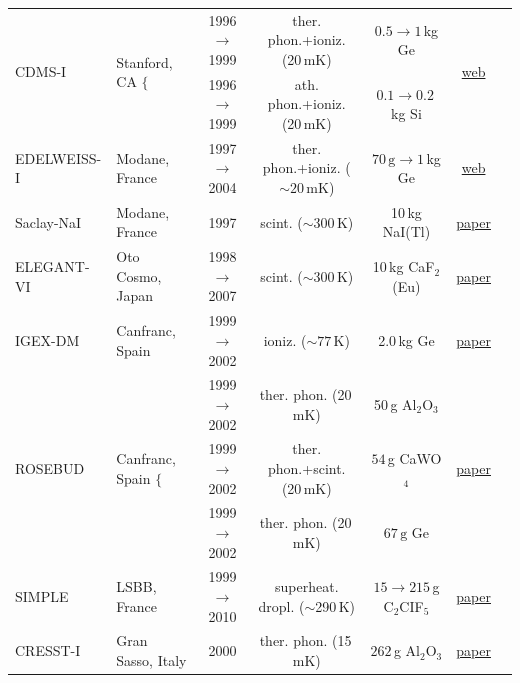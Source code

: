 \begin{table}
{\begin{tabular}{llccccc}
\multirow{2}{*}{{\sc CDMS-I}} & \multirow{2}{*}{Stanford, CA \hspace{4mm} $\Big\{$} & 1996 $\to$ 1999 & ther. phon.+ioniz. (20\,mK)   &  $0.5\to1$\,kg Ge& \multirow{2}{*}{\href{https://www.slac.stanford.edu/exp/cdms/}{web}}&  \multirow{2}{*}{\cite{CDMS-I}}
\\
   & & 1996 $\to$ 1999 & ath. phon.+ioniz. (20\,mK)  &  $0.1\to0.2$\,kg Si&  &
\\

{\sc EDELWEISS-I} & Modane, France & 1997 $\to$ 2004 &  ther. phon.+ioniz. ($\sim20\,$mK) & $70\,\text{g}\to1$\,kg Ge & \href{http://edelweiss.in2p3.fr/index.php}{web} & \cite{Edelweiss-I} 
\\


{\sc Saclay-NaI} & Modane, France & 1997 & scint. ($\sim$300\,K)  &  10\,kg NaI(Tl) & \href{https://doi.org/10.1016/S0927-6505(99)00004-3}{paper} & \cite{SaclayNaI}
\\

{\sc ELEGANT-VI} & Oto Cosmo, Japan & 1998 $\to$ 2007 & scint. ($\sim$300\,K) &  10\,kg CaF$_2$(Eu) & \href{https://doi.org/10.1088/1742-6596/120/4/042019}{paper} & \cite{ELEGANT-VI}
\\

{\sc IGEX-DM} & Canfranc, Spain & 1999 $\to$ 2002 &  ioniz. ($\sim77\,$K) & 2.0\,kg Ge& \href{https://doi.org/10.1016/S0920-5632(03)01401-4}{paper} & \cite{IGEX-DM} \\

\multirow{3}{*}{{\sc ROSEBUD}} & \multirow{3}{*}{Canfranc, Spain $\Biggr\{$} & 1999 $\to$ 2002 & ther. phon. (20\,mK) &  50\,g Al${}_2$O${}_3$& \multirow{3}{*}{\href{https://lsc-canfranc.es/wp-content/uploads/2018/10/ROSEBUD_EN.pdf}{paper}} & \multirow{3}{*}{\cite{ROSEBUD}} \\

 &  & 1999 $\to$ 2002 & ther. phon.+scint.  (20\,mK)  &  $ 54$\,g  CaWO${}_4$ &  &  \\
 
  &  & 1999 $\to$ 2002 & ther. phon. (20\,mK)   &  $ 67\,\text{g}$  Ge &  &  \\

{\sc SIMPLE} & LSBB, France & 1999 $\to$ 2010 &  superheat. dropl. ($\sim$290\,K)  & $15\to215\,$g C${}_2$CIF${}_5$ & \href{https://doi.org/10.1103/PhysRevD.89.072013}{paper} & \cite{SIMPLE}
\\

{\sc CRESST-I} & Gran Sasso, Italy & 2000 & ther. phon. (15\,mK)   &  $262$\,g Al${}_2$O${}_3$ & \href{https://doi.org/10.1016/S0927-6505(02)00111-1}{paper} & \cite{CRESST-I}
\\


\end{tabular}}
\end{table}
